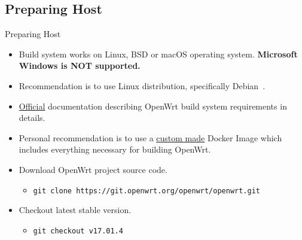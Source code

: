 \subsection{Preparing Host}
\begin{frame}{Preparing Host}
    \begin{itemize}[<+(1)->]
        \item Build system works on Linux, BSD or macOS operating system. \textbf{Microsoft Windows is NOT supported.}
        \item Recommendation is to use Linux distribution, specifically Debian~\cite{debian-website}.
        \item \href{https://openwrt.org/docs/guide-developer/build-system/install-buildsystem}{Official} documentation describing OpenWrt build system requirements in details.
        \item Personal recommendation is to use a \href{https://github.com/hvarga/openwrt-application-development/blob/master/presentation/resources/Dockerfile}{custom made} Docker Image which includes everything necessary for building OpenWrt.
        \item Download OpenWrt project source code.
        \begin{itemize}
            \item \texttt{git clone https://git.openwrt.org/openwrt/openwrt.git}
        \end{itemize}
        \item Checkout latest stable version.
        \begin{itemize}
            \item \texttt{git checkout v17.01.4}
        \end{itemize}
    \end{itemize}
\end{frame}

